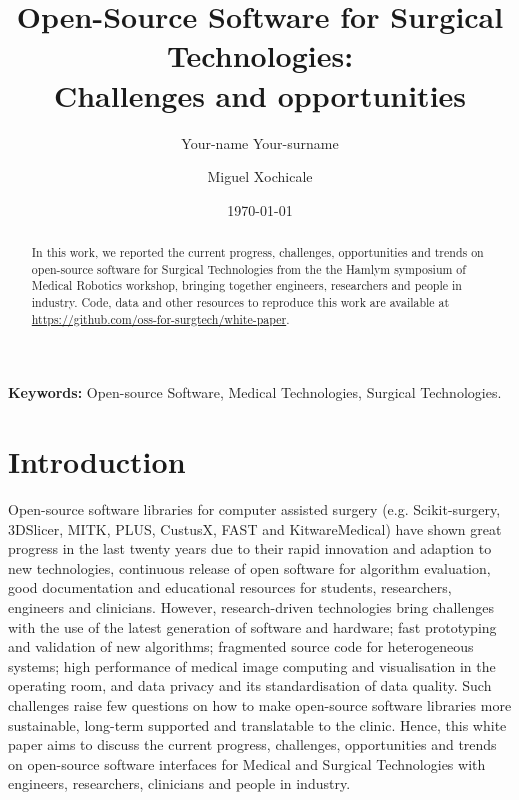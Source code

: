 \documentclass{article}
\title{
Open-Source Software for Surgical Technologies: \\ Challenges and opportunities
}
\author[3]{Your-name Your-surname}
\affil[3]{Your Affiliation}
\author[1, 2]{
Miguel Xochicale
}
\affil[2]{ARC, University College London}
\affil[1]{WEISS, University College London}
\date{
\today
}
\begin{document}
\maketitle

\begin{abstract}
In this work, we reported the current progress, challenges, opportunities and trends on open-source software for Surgical Technologies from the the Hamlym symposium of Medical Robotics workshop, bringing together engineers, researchers and people in industry.
Code, data and other resources to reproduce this work are available at \url{https://github.com/oss-for-surgtech/white-paper}.
\end{abstract}

\textbf{Keywords:} Open-source Software, Medical Technologies, Surgical Technologies.


\section{Introduction}
Open-source software libraries for computer assisted surgery (e.g. Scikit-surgery, 3DSlicer, MITK, PLUS, CustusX, FAST and KitwareMedical) have shown great progress in the last twenty years due to their rapid innovation and adaption to new technologies, continuous release of open software for algorithm evaluation, good documentation and educational resources for students, researchers, engineers and clinicians.
However, research-driven technologies bring challenges with the use of the latest generation of software and hardware; fast prototyping and validation of new algorithms; fragmented source code for heterogeneous systems; high performance of medical image computing and visualisation in the operating room, and data privacy and its standardisation of data quality.
Such challenges raise few questions on how to make open-source software libraries more sustainable, long-term supported and translatable to the clinic. 
Hence, this white paper aims to discuss the current progress, challenges, opportunities and trends on open-source software interfaces for Medical and Surgical Technologies with engineers, researchers, clinicians and people in industry.

\end{document}
